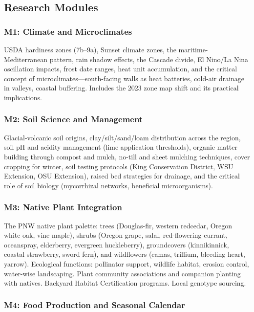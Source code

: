 \documentclass[11pt,letterpaper]{article}
\begin{document}
\subsection{Research Modules}

\subsubsection{M1: Climate and Microclimates}

USDA hardiness zones (7b--9a), Sunset climate zones, the maritime-Mediterranean pattern, rain shadow effects, the Cascade divide, El Nino/La Nina oscillation impacts, frost date ranges, heat unit accumulation, and the critical concept of microclimates---south-facing walls as heat batteries, cold-air drainage in valleys, coastal buffering. Includes the 2023 zone map shift and its practical implications.

\subsubsection{M2: Soil Science and Management}

Glacial-volcanic soil origins, clay/silt/sand/loam distribution across the region, soil pH and acidity management (lime application thresholds), organic matter building through compost and mulch, no-till and sheet mulching techniques, cover cropping for winter, soil testing protocols (King Conservation District, WSU Extension, OSU Extension), raised bed strategies for drainage, and the critical role of soil biology (mycorrhizal networks, beneficial microorganisms).

\subsubsection{M3: Native Plant Integration}

The PNW native plant palette: trees (Douglas-fir, western redcedar, Oregon white oak, vine maple), shrubs (Oregon grape, salal, red-flowering currant, oceanspray, elderberry, evergreen huckleberry), groundcovers (kinnikinnick, coastal strawberry, sword fern), and wildflowers (camas, trillium, bleeding heart, yarrow). Ecological functions: pollinator support, wildlife habitat, erosion control, water-wise landscaping. Plant community associations and companion planting with natives. Backyard Habitat Certification programs. Local genotype sourcing.

\subsubsection{M4: Food Production and Seasonal Calendar}
\end{document}
